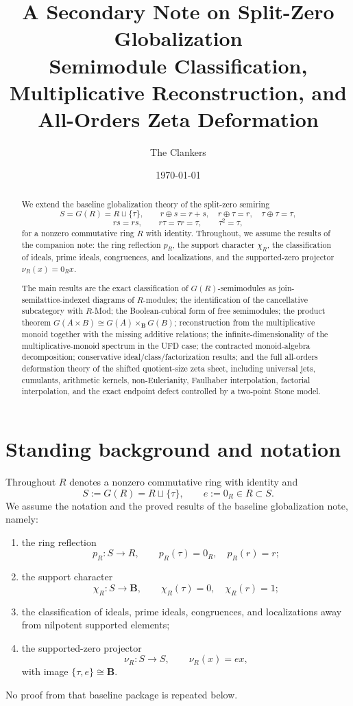 \documentclass[11pt]{amsart}
\title[Secondary Note on Split-Zero Globalization]{A Secondary Note on Split-Zero Globalization\\[4pt]\large Semimodule Classification, Multiplicative Reconstruction, and All-Orders Zeta Deformation}
\author{The Clankers}
\date{\today}
\numberwithin{equation}{section}
\theoremstyle{definition}
\newcommand{\B}{\mathbf B}
\begin{document}
\begin{abstract}
We extend the baseline globalization theory of the split-zero semiring
\[
S=G(R)=R\sqcup\{\tau\},
\qquad
r\oplus s=r+s,
\quad
r\oplus\tau=r,
\quad
\tau\oplus\tau=\tau,
\]
\[
rs=rs,
\qquad
r\tau=\tau r=\tau,
\qquad
\tau^2=\tau,
\]
for a nonzero commutative ring $R$ with identity. Throughout, we assume the results of the companion note: the ring reflection $p_R$, the support character $\chi_R$, the classification of ideals, prime ideals, congruences, and localizations, and the supported-zero projector $\nu_R(x)=0_Rx$.

The main results are the exact classification of $G(R)$-semimodules as join-semilattice-indexed diagrams of $R$-modules; the identification of the cancellative subcategory with $R$-Mod; the Boolean-cubical form of free semimodules; the product theorem $G(A\times B)\cong G(A)\times_{\B}G(B)$; reconstruction from the multiplicative monoid together with the missing additive relations; the infinite-dimensionality of the multiplicative-monoid spectrum in the UFD case; the contracted monoid-algebra decomposition; conservative ideal/class/factorization results; and the full all-orders deformation theory of the shifted quotient-size zeta sheet, including universal jets, cumulants, arithmetic kernels, non-Eulerianity, Faulhaber interpolation, factorial interpolation, and the exact endpoint defect controlled by a two-point Stone model.
\end{abstract}

\maketitle
\tableofcontents

\section{Standing background and notation}

Throughout $R$ denotes a nonzero commutative ring with identity and
\[
S:=G(R)=R\sqcup\{\tau\},
\qquad
e:=0_R\in R\subset S.
\]
We assume the notation and the proved results of the baseline globalization note, namely:
\begin{enumerate}[label=(\roman*)]
    \item the ring reflection
    \[
    p_R:S\to R,
    \qquad
    p_R(\tau)=0_R,
    \quad
    p_R(r)=r;
    \]
    \item the support character
    \[
    \chi_R:S\to\B,
    \qquad
    \chi_R(\tau)=0,
    \quad
    \chi_R(r)=1;
    \]
    \item the classification of ideals, prime ideals, congruences, and localizations away from nilpotent supported elements;
    \item the supported-zero projector
    \[
    \nu_R:S\to S,
    \qquad
    \nu_R(x)=ex,
    \]
    with image $\{\tau,e\}\cong\B$.
\end{enumerate}
No proof from that baseline package is repeated below.
\end{document}
